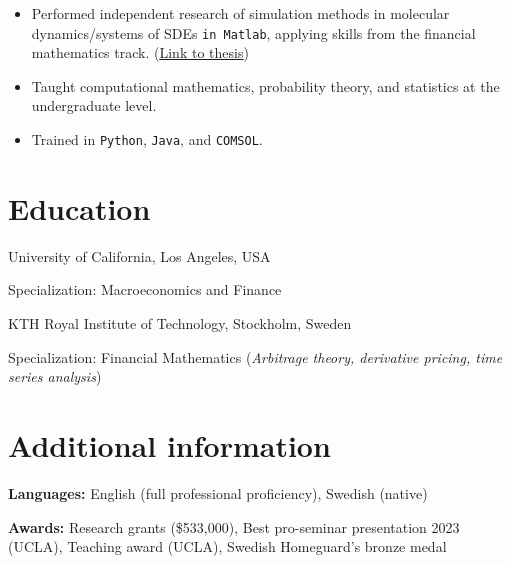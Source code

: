 \documentclass{clean_CV}
\begin{document}
\medskip


\begin{itemize}
    \item Performed independent research of simulation methods in molecular dynamics/systems of SDEs \texttt{in Matlab}, applying skills from the financial mathematics track. \quad (\uline{\href{https://www.diva-portal.org/smash/get/diva2:808180/FULLTEXT01.pdf}{Link to thesis}})
    \item Taught computational mathematics, probability theory, and statistics at the undergraduate level.
    \item Trained in \texttt{Python}, \texttt{Java}, and \texttt{COMSOL}.
\end{itemize}




\section{Education}


University of California, Los Angeles, USA

Specialization: Macroeconomics and Finance

\medskip


KTH Royal Institute of Technology, Stockholm, Sweden

Specialization: Financial Mathematics (\textit{Arbitrage theory, derivative pricing, time series analysis})





\section{Additional information}

\textbf{Languages:} English (full professional proficiency), Swedish (native)

\textbf{Awards:} Research grants (\$533,000), Best pro-seminar presentation 2023 (UCLA), Teaching award (UCLA), Swedish Homeguard's bronze medal
\end{document}
